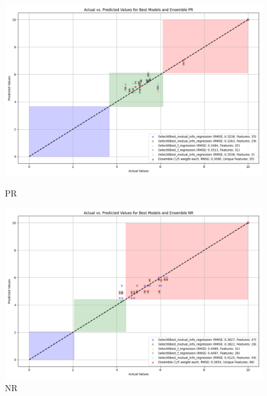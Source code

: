 \begin{figure}[H]
    \centering
    \begin{minipage}{0.45\textwidth}
        \centering
        \includegraphics[width=\linewidth]{reg_section_specxtra/images_reg_featred_ensemble/actual_vs_predicted_best_feature_selection_and_ensemble_PR.png}
        \caption{PR}
        \label{fig_reg_specxtra:pr_reg_featred_best_ensemble}
    \end{minipage}\hfill
    \begin{minipage}{0.45\textwidth}
        \centering
        \includegraphics[width=\linewidth]{reg_section_specxtra/images_reg_featred_ensemble/actual_vs_predicted_best_feature_selection_and_ensemble_NR.png}
        \caption{NR}
        \label{fig_reg_specxtra:nr_reg_featred_best_ensemble}
    \end{minipage}
\end{figure}

